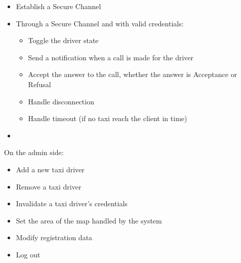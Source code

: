 \documentclass{article}
\begin{document}
		\begin{itemize}
			\item Establish a Secure Channel
			\item Through a Secure Channel and with valid credentials:\@
				\begin{itemize}
					\item Toggle the driver state
					\item Send a notification when a call is made for the driver
					\item Accept the answer to the call, whether the answer is Acceptance or Refusal
					\item Handle disconnection
					\item Handle timeout (if no taxi reach the client in time)
				\end{itemize}
			\item 
		\end{itemize}
On the admin side:\@
		\begin{itemize}
			\item Add a new taxi driver
			\item Remove a taxi driver
			\item Invalidate a taxi driver's credentials %
			\item Set the area of the map handled by the system %
			\item Modify registration data
			\item Log out
		\end{itemize}
\end{document}
